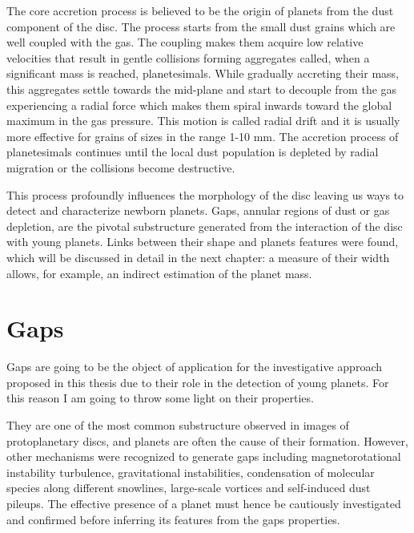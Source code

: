 \documentclass[a4paper,10pt]{report}
\begin{document}
The core accretion process is believed to be the origin of planets from the dust component of the disc. 
The process starts from the small dust grains which are well coupled with the gas.
The coupling makes them acquire low relative velocities that result in gentle collisions forming aggregates called, when a significant mass is reached, planetesimals.
While gradually accreting their mass, this aggregates settle towards the mid-plane and start to decouple from the gas experiencing a radial force 
which makes them spiral inwards toward the global maximum in the gas pressure. This motion is called radial drift and it is usually more effective for grains of sizes in the range 
1-10 mm.
The accretion process of planetesimals continues until the local dust population is depleted by radial migration or the collisions become destructive.

This process profoundly influences the morphology of the disc leaving us ways to detect and characterize newborn planets. 
Gaps, annular regions of dust or gas depletion, are the pivotal substructure generated from the interaction of the disc with young planets.
Links between their shape and planets features were found, which will be discussed in detail in the next chapter:
a measure of their width allows, for example, an indirect estimation of the planet mass.

\section{Gaps}

Gaps are going to be the object of application for the investigative approach proposed in this thesis due
to their role in the detection of young planets.
For this reason I am going to throw some light on their properties.

They are one of the most common substructure observed in images of protoplanetary discs, and
planets are often the cause of their formation. However, other mechanisms were recognized to generate gaps
including magnetorotational instability turbulence, gravitational instabilities, condensation of molecular species along different snowlines,
large-scale vortices and self-induced dust pileups. The effective presence of a planet must hence be cautiously investigated and confirmed 
before inferring its features from the gaps properties. 
\end{document}
